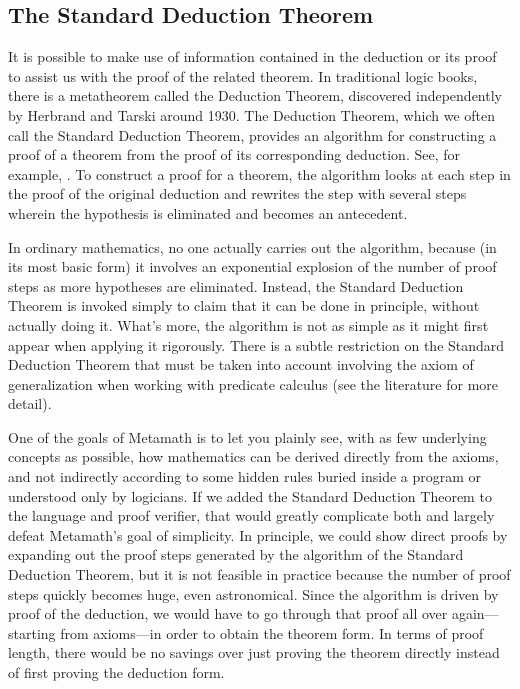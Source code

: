 \subsection{The Standard Deduction Theorem}

It is possible to make use of information
contained in the deduction or its proof to assist us with the proof of
the related theorem.
In traditional logic books, there is a metatheorem called the
Deduction Theorem,
discovered independently by Herbrand and Tarski around 1930.
The Deduction Theorem, which we often call the Standard Deduction Theorem,
provides an algorithm for constructing a proof of a theorem from the
proof of its corresponding deduction. See, for example,
\cite[p.~56]{Margaris}.
To construct a proof for a theorem, the
algorithm looks at each step in the proof of the original deduction and
rewrites the step with several steps wherein the hypothesis is eliminated
and becomes an antecedent.

In ordinary mathematics, no one actually carries out the algorithm,
because (in its most basic form) it involves an exponential explosion of
the number of proof steps as more hypotheses are eliminated. Instead,
the Standard Deduction Theorem is invoked simply to claim that it can
be done in principle, without actually doing it.
What's more, the algorithm is not as simple as it might first appear
when applying it rigorously.
There is a subtle restriction on the Standard Deduction Theorem
that must be taken into account involving the axiom of generalization
when working with predicate calculus (see the literature for more detail).

One of the goals of Metamath is to let you plainly see, with as few
underlying concepts as possible, how mathematics can be derived directly
from the axioms, and not indirectly according to some hidden rules
buried inside a program or understood only by logicians. If we added
the Standard Deduction Theorem to the language and proof verifier,
that would greatly complicate both and largely defeat Metamath's goal
of simplicity. In principle, we could show direct proofs by expanding
out the proof steps generated by the algorithm of the Standard Deduction
Theorem, but it is not feasible in practice because the number of proof
steps quickly becomes huge, even astronomical. Since the algorithm is
driven by proof of the deduction, we would have to go through that proof
all over again—starting from axioms—in order to obtain the theorem
form. In terms of proof length, there would be no savings over just
proving the theorem directly instead of first proving the deduction form.


